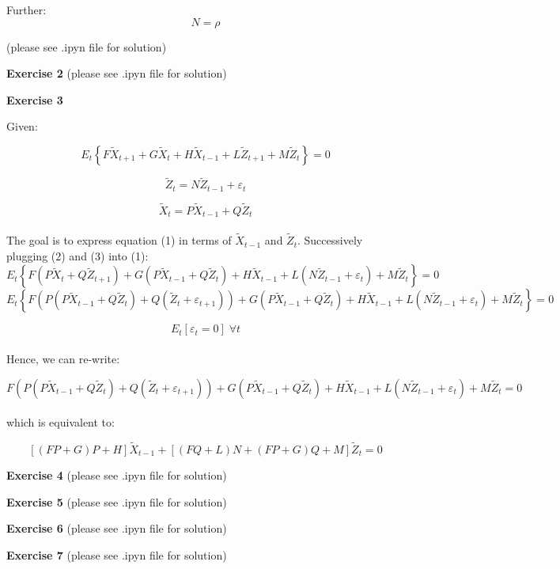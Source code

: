 \documentclass[letterpaper,12pt]{article}
\theoremstyle{definition}
\begin{document}
Further:
$$N=\rho$$

(please see .ipyn file for solution)

\noindent\textbf{Exercise 2}
(please see .ipyn file for solution)

\noindent\textbf{Exercise 3}

Given:

\begin{equation}
  E_{t}\left\{F \tilde{X}_{t+1}+G \tilde{X}_{t}+H \tilde{X}_{t-1}+L \tilde{Z}_{t+1}+M \tilde{Z}_{t}\right\}=0
\end{equation}

\begin{equation}
  \tilde{Z}_{t}=N \tilde{Z}_{t-1}+\varepsilon_{t}
\end{equation}

\begin{equation}
  \tilde{X}_{t}=P \tilde{X}_{t-1}+Q \tilde{Z}_{t}
\end{equation}
\\ The goal is to express equation (1) in terms of $\tilde{X}_{t-1}$ and $\tilde{Z}_{t}$. Successively plugging (2) and (3) into (1):
$$E_{t}\left\{F (P \tilde{X}_{t}+Q \tilde{Z}_{t+1})+G (P \tilde{X}_{t-1}+Q \tilde{Z}_{t})+H \tilde{X}_{t-1}+L(N \tilde{Z}_{t-1}+\varepsilon_{t})+M \tilde{Z}_{t}\right\}=0$$
$$E_{t}\left\{F (P (P \tilde{X}_{t-1}+Q \tilde{Z}_{t})+Q (\tilde{Z}_{t}+\varepsilon_{t+1}))+G (P \tilde{X}_{t-1}+Q \tilde{Z}_{t})+H \tilde{X}_{t-1}+L(N \tilde{Z}_{t-1}+\varepsilon_{t})+M \tilde{Z}_{t}\right\}=0$$

$$E_{t}[\varepsilon_{t}=0]\;\forall t$$
\\ Hence, we can re-write:

$$F(P (P \tilde{X}_{t-1}+Q \tilde{Z}_{t})+Q (\tilde{Z}_{t}+\varepsilon_{t+1}))+G (P \tilde{X}_{t-1}+Q \tilde{Z}_{t})+H \tilde{X}_{t-1}+L(N \tilde{Z}_{t-1}+\varepsilon_{t})+M \tilde{Z}_{t}=0$$
\\ which is equivalent to:

$$[(F P+G) P+H] \tilde{X}_{t-1}+[(F Q+L) N+(F P+G) Q+M] \tilde{Z}_{t}=0$$

\vspace{5mm}

\noindent\textbf{Exercise 4}
(please see .ipyn file for solution)

\noindent\textbf{Exercise 5}
(please see .ipyn file for solution)

\noindent\textbf{Exercise 6}
(please see .ipyn file for solution)

\noindent\textbf{Exercise 7}
(please see .ipyn file for solution)
\end{document}
